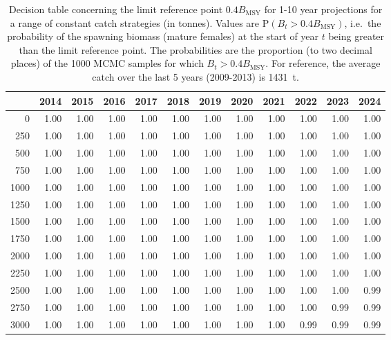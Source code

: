 \documentclass[11pt]{book}
\newcommand{\Bmsy}{B_\mathrm{MSY}}
\begin{document}
\clearpage


\begin{table}[!ht]
\centering
\caption{Decision table concerning the limit reference point $0.4 \Bmsy$ for 1-10 year projections for a range of constant catch strategies (in tonnes). Values are P$(B_t > 0.4 \Bmsy)$, i.e.~the probability of the spawning biomass (mature females) at the start of year $t$ being greater than the limit reference point. The probabilities are the proportion (to two decimal places) of the 1000 MCMC samples for which $B_t > 0.4 \Bmsy$. For reference, the average catch over the last 5 years (2009-2013) is 1431~t.} 
\label{tab:LRP}
\begin{tabular}{rrrrrrrrrrrr}
  \\[-1.0ex] \hline
 & 2014 & 2015 & 2016 & 2017 & 2018 & 2019 & 2020 & 2021 & 2022 & 2023 & 2024 \\ 
  \hline
0 & 1.00 & 1.00 & 1.00 & 1.00 & 1.00 & 1.00 & 1.00 & 1.00 & 1.00 & 1.00 & 1.00 \\ 
  250 & 1.00 & 1.00 & 1.00 & 1.00 & 1.00 & 1.00 & 1.00 & 1.00 & 1.00 & 1.00 & 1.00 \\ 
  500 & 1.00 & 1.00 & 1.00 & 1.00 & 1.00 & 1.00 & 1.00 & 1.00 & 1.00 & 1.00 & 1.00 \\ 
  750 & 1.00 & 1.00 & 1.00 & 1.00 & 1.00 & 1.00 & 1.00 & 1.00 & 1.00 & 1.00 & 1.00 \\ 
  1000 & 1.00 & 1.00 & 1.00 & 1.00 & 1.00 & 1.00 & 1.00 & 1.00 & 1.00 & 1.00 & 1.00 \\ 
  1250 & 1.00 & 1.00 & 1.00 & 1.00 & 1.00 & 1.00 & 1.00 & 1.00 & 1.00 & 1.00 & 1.00 \\ 
  1500 & 1.00 & 1.00 & 1.00 & 1.00 & 1.00 & 1.00 & 1.00 & 1.00 & 1.00 & 1.00 & 1.00 \\ 
  1750 & 1.00 & 1.00 & 1.00 & 1.00 & 1.00 & 1.00 & 1.00 & 1.00 & 1.00 & 1.00 & 1.00 \\ 
  2000 & 1.00 & 1.00 & 1.00 & 1.00 & 1.00 & 1.00 & 1.00 & 1.00 & 1.00 & 1.00 & 1.00 \\ 
  2250 & 1.00 & 1.00 & 1.00 & 1.00 & 1.00 & 1.00 & 1.00 & 1.00 & 1.00 & 1.00 & 1.00 \\ 
  2500 & 1.00 & 1.00 & 1.00 & 1.00 & 1.00 & 1.00 & 1.00 & 1.00 & 1.00 & 1.00 & 0.99 \\ 
  2750 & 1.00 & 1.00 & 1.00 & 1.00 & 1.00 & 1.00 & 1.00 & 1.00 & 1.00 & 0.99 & 0.99 \\ 
  3000 & 1.00 & 1.00 & 1.00 & 1.00 & 1.00 & 1.00 & 1.00 & 1.00 & 0.99 & 0.99 & 0.99 \\ 
   \hline
\end{tabular}
\end{table}
\end{document}
